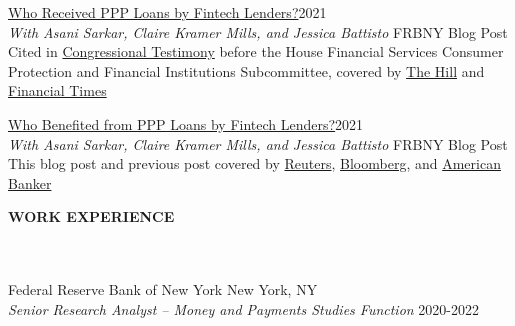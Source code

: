 \documentclass[a4paper]{article}
\newcommand{\lineunder} {
    \vspace*{-8pt} \\
    \hspace*{-18pt} \hrulefill \\
}
\newcommand{\header} [1] {
    {\hspace*{-18pt}\vspace*{1pt} \textbf{\MakeUppercase{#1}}}
    \lineunder
}
\begin{document}
\href{https://libertystreeteconomics.newyorkfed.org/2021/05/who-received-ppp-loans-by-fintech-lenders/}{Who Received PPP Loans by Fintech Lenders?}\hfill 2021 \\ 
\textit{With Asani Sarkar, Claire Kramer Mills, and Jessica Battisto}  \hfill{FRBNY Blog Post} \\
\vspace{3mm}
Cited in 
\href{https://docs.house.gov/meetings/BA/BA15/20210929/114093/HHRG-117-BA15-Wstate-Henry-NickieM-20210929.pdf}{Congressional Testimony} before the House Financial Services
Consumer Protection and Financial Institutions Subcommittee, covered by
\href{https://thehill.com/opinion/finance/560133-fintech-lenders-are-critical-to-small-businesses-accessing-ppp}{The Hill} and
\href{https://www.ft.com/content/4face0c6-c1fb-47af-972b-8749e92b4baf?desktop=true&segmentId=7c8f09b9-9b61-4fbb-9430-9208a9e233c8}{Financial Times}



\vspace{3mm}
\href{https://libertystreeteconomics.newyorkfed.org/2021/05/who-benefited-from-ppp-loans-by-fintech-lenders/}{Who Benefited from PPP Loans by Fintech Lenders?}\hfill 2021 \\
\textit{With Asani Sarkar, Claire Kramer Mills, and Jessica Battisto} \hfill FRBNY Blog Post \\
\vspace{3mm}
This blog post and previous post covered by
\href{https://www.reuters.com/article/usa-fed-small-business-idUSL2N2NE15C}{Reuters}, \href{https://www.bloombergquint.com/onweb/black-business-owners-turned-to-fintech-to-get-u-s-pandemic-aid}{Bloomberg}, and \href{https://www.americanbanker.com/news/can-fintechs-build-on-strong-ppp-lending-to-black-businesses}{American Banker}

\vspace{5mm}

\header{Work Experience}
\vspace{1mm}
Federal Reserve Bank of New York \hfill New York, NY\\
\textit{Senior Research Analyst – Money and Payments Studies Function} \hfill 2020-2022 \\
\vspace{3mm}
\end{document}
